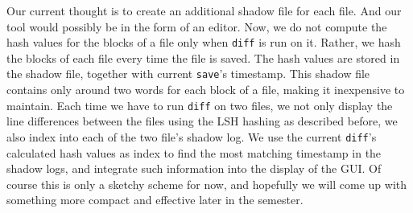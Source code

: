 \documentclass{article}
\begin{document}
Our current thought is to create an additional shadow file for each file. And our tool would possibly be in the form of an editor. Now, we do not compute the hash values for the blocks of a file only when \texttt{diff} is run on it. Rather, we hash the blocks of each file every time the file is saved. The hash values are stored in the shadow file, together with current \texttt{save}'s timestamp. This shadow file contains only around two words for each block of a file, making it inexpensive to maintain. Each time we have to run \texttt{diff} on two files, we not only display the line differences between the files using the LSH hashing as described before, we also index into each of the two file's shadow log. We use the current \texttt{diff}'s calculated hash values as index to find the most matching timestamp in the shadow logs, and integrate such information into the display of the GUI. Of course this is only a sketchy scheme for now, and hopefully we will come up with something more compact and effective later in the semester.



\end{document}
